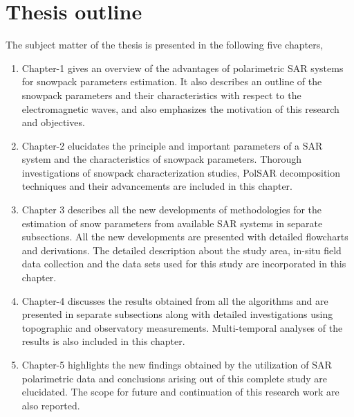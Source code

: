 \section{Thesis outline}
	The subject matter of the thesis is presented in the following five chapters, 
\begin{enumerate}[label=\checkmark]
\item	Chapter-1 gives an overview of the advantages of polarimetric SAR systems for snowpack parameters estimation. It also describes an outline of the snowpack parameters and their characteristics with respect to the electromagnetic waves, and also emphasizes the motivation of this research and objectives.
\item	Chapter-2 elucidates the principle and important parameters of a SAR system and the characteristics of snowpack parameters. Thorough investigations of snowpack characterization studies, PolSAR decomposition techniques and their advancements are included in this chapter. 
\item	Chapter 3 describes all the new developments of methodologies for the estimation of snow parameters from available SAR systems in separate subsections. All the new developments are presented with detailed flowcharts and derivations. The detailed description about the study area, in-situ field data collection and the data sets used for this study are incorporated in this chapter. 
\item Chapter-4 discusses the results obtained from all the algorithms and are presented in separate subsections along with detailed investigations using topographic and observatory measurements. Multi-temporal analyses of the results is also included in this chapter. 
\item	Chapter-5 highlights the new findings obtained by the utilization of SAR polarimetric data and conclusions arising out of this complete study are elucidated. The scope for future and continuation of this research work are also reported.  
\end{enumerate}

